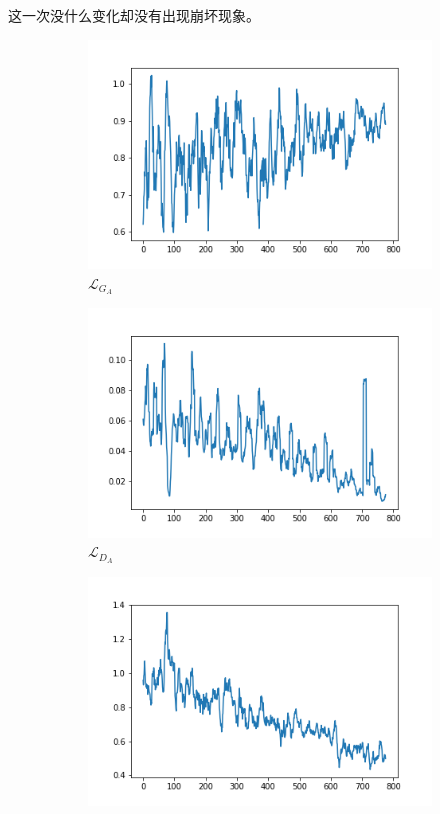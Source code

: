 \documentclass{beamer}
\begin{document}
\begin{frame}
这一次没什么变化却没有出现崩坏现象。
\begin{figure}[htb]
    \centering
    \begin{subfigure}[b]{0.23\linewidth}
        \includegraphics[width=\linewidth]{exp3_G_A.png}
        \caption{$\mathcal{L}_{G_A}$}
      \end{subfigure}
      \begin{subfigure}[b]{0.23\linewidth}
        \includegraphics[width=\linewidth]{exp3_D_A.png}
        \caption{$\mathcal{L}_{D_A}$}
      \end{subfigure}
      \begin{subfigure}[b]{0.23\linewidth}
        \includegraphics[width=\linewidth]{exp3_cycle_A.png}

\end{subfigure}
\end{figure}
\end{frame}
\end{document}
